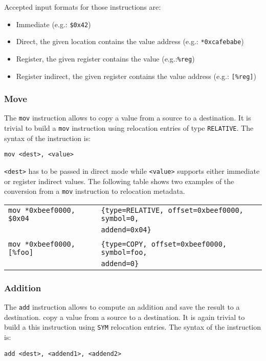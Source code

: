 \documentclass[11pt,twoside,a4paper]{article}
\begin{document}
Accepted input formats for those instructions are:
\begin{itemize}
\item Immediate (e.g.: \texttt{\$0x42})
\item Direct, the given location contains the value address (e.g.: \texttt{*0xcafebabe})
\item Register, the given register contains the value (e.g.:\texttt{\%reg})
\item Register indirect, the given register contains the value address (e.g.: \texttt{[\%reg]})
\end{itemize}


\subsubsection{Move}
The \texttt{mov} instruction allows to copy a value from a source to a destination. It is trivial to build a \texttt{mov} instruction using relocation entries of type \texttt{RELATIVE}. The syntax of the instruction is:

\texttt{mov <dest>, <value>}

\texttt{<dest>} has to be passed in direct mode while \texttt{<value>} supports either immediate or register indirect values. The following table shows two examples of the conversion from a \texttt{mov} instruction to relocation metadata.

\begin{tabular}{ l | l }
  \hline
  \texttt{mov *0xbeef0000, \$0x04} & \texttt{\{type=RELATIVE, offset=0xbeef0000, symbol=0,} \\ &  \texttt{addend=0x04\}} \\
  \hline \\
  \texttt{mov *0xbeef0000, [\%foo]} & \texttt{\{type=COPY, offset=0xbeef0000, symbol=foo,} \\ & \texttt{addend=0\}} \\
  \hline
\end{tabular}


\subsubsection{Addition}
The \texttt{add} instruction allows to compute an addition and save the result to a destination. copy a value from a source to a destination. It is again trivial to build a this instruction using \texttt{SYM} relocation entries. The syntax of the instruction is:

\texttt{add <dest>, <addend1>, <addend2>}
\end{document}
